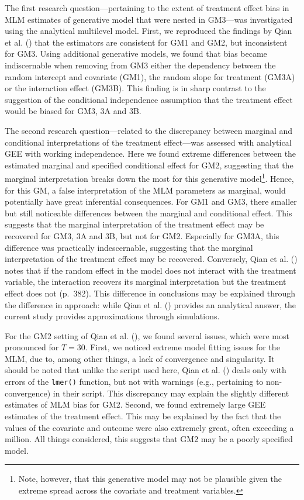 \documentclass[
  12pt,
  a4paper,
]{article}
\begin{document}
The first research question---pertaining to the extent of treatment
effect bias in MLM estimates of generative model that were nested in
GM3---was investigated using the analytical multilevel model. First, we
reproduced the findings by Qian et al. ()
that the estimators are consistent for GM1 and GM2, but inconsistent for
GM3. Using additional generative models, we found that bias became
indiscernable when removing from GM3 either the dependency between the
random intercept and covariate (GM1), the random slope for treatment
(GM3A) or the interaction effect (GM3B). This finding is in sharp
contrast to the suggestion of the conditional independence assumption
that the treatment effect would be biased for GM3, 3A and 3B.

The second research question---related to the discrepancy between
marginal and conditional interpretations of the treatment effect---was
assessed with analytical GEE with working independence. Here we found
extreme differences between the estimated marginal and specified
conditional effect for GM2, suggesting that the marginal interpretation
breaks down the most for this generative model\footnote{Note, however,
  that this generative model may not be plausible given the extreme
  spread across the covariate and treatment variables.}. Hence, for this
GM, a false interpretation of the MLM parameters as marginal, would
potentially have great inferential consequences. For GM1 and GM3, there
smaller but still noticeable differences between the marginal and
conditional effect. This suggests that the marginal interpretation of
the treatment effect may be recovered for GM3, 3A and 3B, but not for
GM2. Especially for GM3A, this difference was practically indescernable,
suggesting that the marginal interpretation of the treatment effect may
be recovered. Conversely, Qian et al. ()
notes that if the random effect in the model does not interact with the
treatment variable, the interaction recovers its marginal interpretation
but the treatment effect does not (p.~382). This difference in
conclusions may be explained through the difference in approach: while
Qian et al. () provides an analytical
answer, the current study provides approximations through simulations.

For the GM2 setting of Qian et al. (), we
found several issues, which were most pronounced for \(T = 30\). First,
we noticed extreme model fitting issues for the MLM, due to, among other
things, a lack of convergence and singularity. It should be noted that
unlike the script used here, Qian et al. ()
deals only with errors of the \texttt{lmer()} function, but not with
warnings (e.g., pertaining to non-convergence) in their script. This
discrepancy may explain the slightly different estimates of MLM bias for
GM2. Second, we found extremely large GEE estimates of the treatment
effect. This may be explained by the fact that the values of the
covariate and outcome were also extremely great, often exceeding a
million. All things considered, this suggests that GM2 may be a poorly
specified model.
\end{document}
